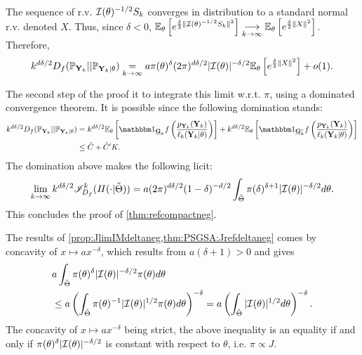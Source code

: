 \begin{proofb}
\begin{align}
\end{align}
The sequence of r.v. $\mathcal{I}(\theta)^{-1/2}S_k$ converges in distribution to a standard normal r.v. denoted $X$.
Thus, since $\delta<0$, $\mathbb{E}_\theta\left[e^{\frac{\delta}{2} \|\mathcal{I}(\theta)^{-1/2}S_k\|^2}\right]\overset{\ }{\underset{k\rightarrow\infty}{\longrightarrow}}\mathbb{E}_\theta\left[e^{\frac{\delta}{2} \|X\|^2}\right]$. %
Therefore, 
\begin{align}
    k^{d\delta/2} D_f(\mathbb{P}_{\mathbf{Y}_k} || \mathbb{P}_{\mathbf{Y}_k|\theta}) \overset{}{\underset{k\rightarrow\infty}{=}} a\pi(\theta)^\delta(2\pi)^{d\delta/2}|\mathcal{I}(\theta)|^{-\delta/2}\mathbb{E}_\theta\left[e^{\frac{\delta}{2} \|X\|^2}\right] + o(1).  
\end{align}

The second step of the proof it to integrate this limit w.r.t. $\pi$, using a dominated convergence theorem.
It is possible since the following domination stands:
\begin{equation}
    \begin{aligned}
    k^{d\delta/2}D_f(\PP_{\mbf Y_k}||\PP_{\mbf Y_k|\theta}) 
            &=  k^{d\delta/2} \EE_{\theta}\left[\indic_{\ubf G_k}f\left(\frac{p_{\mbf Y_k}(\mbf Y_k)}{\ell_k(\mbf Y_k|\theta)}\right) \right] + 
            k^{d\delta/2} \EE_{\theta}\left[ \indic_{\ubf G_k^c}f\left(\frac{p_{\mbf Y_k}(\mbf Y_k)}{\ell_k(\mbf Y_k|\theta)}\right) \right] \\
         &\leq \hat C  + \hat C'K. %
    \end{aligned}
\end{equation}
The domination above makes the following licit:
    \begin{equation}
        \lim_{k\rightarrow\infty} k^{d\delta/2}\mathscr{I}^k_{D_f}(\varPi(\cdot|\tilde\Theta))  = a(2\pi)^{d\delta/2}(1-\delta)^{-d/2} \int_{\tilde\Theta}\pi(\delta)^{\delta+1}|\mathcal{I}(\theta)|^{-\delta/2}d\theta.
    \end{equation}
This concludes the proof of \cref{thm:refcompactneg}. 

The results of \cref{prop:JlimIMdeltaneg,thm:PSGSA:Jrefdeltaneg} comes by 
concavity of $x\mapsto a x^{-\delta}$, which results from $a(\delta+1)>0$ and  gives
    \begin{align}
    \nonumber
        &a \int_{\tilde\Theta}\pi(\theta)^\delta |\cI(\theta)|^{-\delta/2}\pi(\theta)d\theta \\
            &\leq a\left(\int_{\tilde\Theta}\pi(\theta)^{-1}|\cI(\theta)|^{1/2}\pi(\theta)d\theta\right)^{-\delta}
            = a \left(\int_{\tilde\Theta} |\cI(\theta)|^{1/2} d\theta\right)^{-\delta}. %
    \end{align}
The concavity of $x\mapsto a x^{-\delta}$ being strict, the above inequality is an equality if and only if 
$\pi(\theta)^\delta|\mathcal{I}(\theta)|^{-\delta/2}$ is constant with respect to  $\theta$, i.e. $\pi\propto J$.



\end{proofb}




